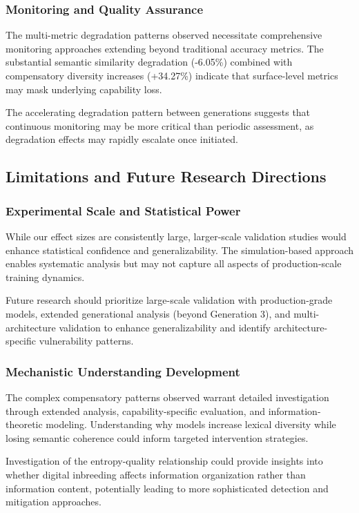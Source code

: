 \documentclass{article}
\begin{document}
\subsubsection{Monitoring and Quality Assurance}

The multi-metric degradation patterns observed necessitate comprehensive monitoring approaches extending beyond traditional accuracy metrics. The substantial semantic similarity degradation (-6.05\%) combined with compensatory diversity increases (+34.27\%) indicate that surface-level metrics may mask underlying capability loss.

The accelerating degradation pattern between generations suggests that continuous monitoring may be more critical than periodic assessment, as degradation effects may rapidly escalate once initiated.

\subsection{Limitations and Future Research Directions}

\subsubsection{Experimental Scale and Statistical Power}

While our effect sizes are consistently large, larger-scale validation studies would enhance statistical confidence and generalizability. The simulation-based approach enables systematic analysis but may not capture all aspects of production-scale training dynamics.

Future research should prioritize large-scale validation with production-grade models, extended generational analysis (beyond Generation 3), and multi-architecture validation to enhance generalizability and identify architecture-specific vulnerability patterns.

\subsubsection{Mechanistic Understanding Development}

The complex compensatory patterns observed warrant detailed investigation through extended analysis, capability-specific evaluation, and information-theoretic modeling. Understanding why models increase lexical diversity while losing semantic coherence could inform targeted intervention strategies.

Investigation of the entropy-quality relationship could provide insights into whether digital inbreeding affects information organization rather than information content, potentially leading to more sophisticated detection and mitigation approaches.
\end{document}
